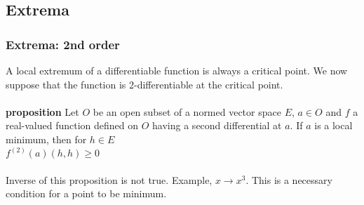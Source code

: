 \documentclass{beamer}
\begin{document}
\subsection{Extrema}
\begin{frame}
\frametitle{Extrema: 2nd order}
A local extremum of a differentiable function is always a critical point. We now suppose that the function is 2-differentiable at the critical point.\\~\\


\textbf{proposition} Let $O$ be an open subset of a normed vector space $E$, $a \in O$ and $f$ a real-valued function defined on $O$ having a second differential at $a$. If $a$ is a local minimum, then for $h \in E$ \\

\hspace*{3cm} $f^{(2)}(a)(h,h) \geq 0$
\\~\\

Inverse of this proposition is not true. Example, $x \to x^3$. This is a necessary condition for a point to be minimum.


\end{frame}
\end{document}
